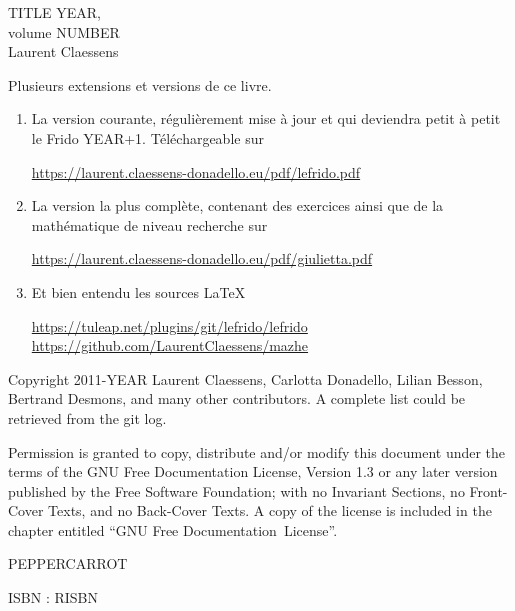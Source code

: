 \documentclass[a4paper,twoside,11pt]{book}
\begin{document}
\pagestyle{empty}

\phantom{Foo}
\newpage

\phantom{Foo}
\newpage

\begin{center}
    TITLE YEAR, \\
    volume NUMBER \\
    Laurent Claessens
\end{center}

\newpage

Plusieurs extensions et versions de ce livre.
\begin{enumerate}
    \item
        La version courante, régulièrement mise à jour et qui deviendra petit à petit le Frido YEAR+1. Téléchargeable sur
        \begin{center}
            \url{https://laurent.claessens-donadello.eu/pdf/lefrido.pdf}
        \end{center}
    \item
        La version la plus complète, contenant des exercices ainsi que de la mathématique de niveau recherche sur
        \begin{center}
            \url{https://laurent.claessens-donadello.eu/pdf/giulietta.pdf}
        \end{center}
    \item
        Et bien entendu les sources \LaTeX\
        \begin{center}
            \url{https://tuleap.net/plugins/git/lefrido/lefrido}\\
            \url{https://github.com/LaurentClaessens/mazhe}
        \end{center}
\end{enumerate}

\newpage

\phantom{un foobar bleuté}

\vfill

\begin{center}
Copyright 2011-YEAR  Laurent Claessens, Carlotta Donadello, Lilian Besson, Bertrand Desmons, and many other contributors. A complete list could be retrieved from the git log.

Permission is granted to copy, distribute and/or modify this document under the terms of the GNU Free Documentation License, Version 1.3 or any later version published by the Free Software Foundation; with no Invariant Sections, no Front-Cover Texts, and no Back-Cover Texts. A copy of the license is included in the chapter entitled ``GNU Free Documentation~License''.
\end{center}

\begin{center}
    PEPPERCARROT
\end{center}

    \begin{center}
ISBN : RISBN
    \end{center}
\end{document}
